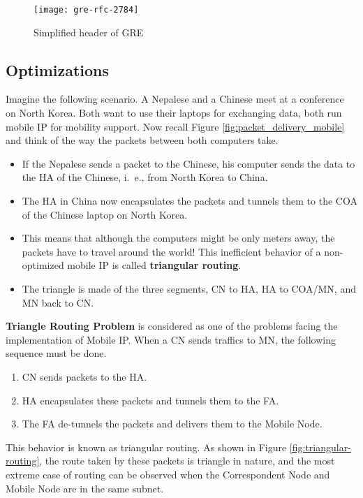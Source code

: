 
\begin{figure}[ht!]
	\centering
	\texttt{[image: gre-rfc-2784]}
	\caption{Simplified header of GRE}\label{fig:protocol-fields-for-gre-rfc-2784}
\end{figure}

	
\subsection{Optimizations}
Imagine the following scenario. A Nepalese and a Chinese meet at a conference on North Korea. Both want to use their laptops for exchanging data, both run mobile IP for mobility support. Now recall Figure \ref{fig:packet_delivery_mobile} and think of the way the packets between both computers take.

\begin{itemize}
	\item If the Nepalese sends a packet to the Chinese, his computer sends the data to the HA of the Chinese, i.\ e., from North Korea to China. 
	\item The HA in China now encapsulates the packets and tunnels them to the COA of the Chinese laptop on North Korea. 
	\item This means that although the computers might be only meters away, the packets have to travel around the world! This inefficient behavior of a non-optimized mobile IP is called \textbf{triangular routing}. 
	\item The triangle is made of the three segments, CN to HA, HA to COA/MN, and MN back to CN.
\end{itemize}




\textbf{Triangle Routing Problem} is considered as one of the problems facing the implementation of Mobile IP. When a CN sends traffics to MN, the following sequence must be done. 
\begin{enumerate}
	\item CN sends packets to the HA.
	\item HA encapsulates these packets and tunnels	them to the FA.
	\item The FA de-tunnels the packets and delivers them to the Mobile Node. 
\end{enumerate}
This behavior is known as triangular routing. As shown in Figure \ref{fig:triangular-routing}, the route taken by these packets is triangle in nature, and the most extreme case of routing can be observed when the Correspondent Node and Mobile Node are in the same subnet.


